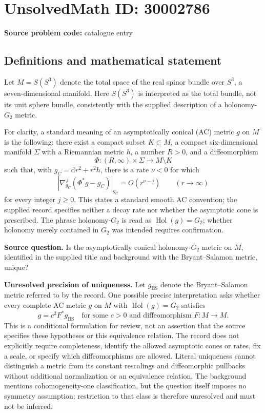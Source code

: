 \documentclass[11pt]{article}
\begin{document}
\section*{UnsolvedMath ID: 30002786}
\textbf{Source problem code:} catalogue entry
\subsection{Definitions and mathematical statement}
Let \(M=S(S^3)\) denote the total space of the real spinor bundle over \(S^3\), a seven-dimensional manifold. Here \(S(S^3)\) is interpreted as the total bundle, not its unit sphere bundle, consistently with the supplied description of a holonomy-\(G_2\) metric.

For clarity, a standard meaning of an asymptotically conical (AC) metric \(g\) on \(M\) is the following: there exist a compact subset \(K\subset M\), a compact six-dimensional manifold \(\Sigma\) with a Riemannian metric \(h\), a number \(R>0\), and a diffeomorphism
\[
\Phi:(R,\infty)\times\Sigma\longrightarrow M\setminus K
\]
such that, with \(g_C=\mathrm{d}r^2+r^2h\), there is a rate \(\nu<0\) for which
\[
\left|\nabla_{g_C}^{\,j}(\Phi^*g-g_C)\right|_{g_C}
=O(r^{\nu-j})\qquad(r\to\infty)
\]
for every integer \(j\geq0\). This states a standard smooth AC convention; the supplied record specifies neither a decay rate nor whether the asymptotic cone is prescribed. The phrase holonomy-\(G_2\) is read as \(\operatorname{Hol}(g)=G_2\); whether holonomy merely contained in \(G_2\) was intended requires confirmation.

\textbf{Source question.} Is the asymptotically conical holonomy-\(G_2\) metric on \(M\), identified in the supplied title and background with the Bryant--Salamon metric, unique?

\textbf{Unresolved precision of uniqueness.} Let \(g_{\mathrm{BS}}\) denote the Bryant--Salamon metric referred to by the record. One possible precise interpretation asks whether every complete AC metric \(g\) on \(M\) with \(\operatorname{Hol}(g)=G_2\) satisfies
\[
 g=c^2F^*g_{\mathrm{BS}}
 \quad\text{for some }c>0\text{ and diffeomorphism }F:M\longrightarrow M.
\]
This is a conditional formulation for review, not an assertion that the source specifies these hypotheses or this equivalence relation. The record does not explicitly require completeness, identify the allowed asymptotic cones or rates, fix a scale, or specify which diffeomorphisms are allowed. Literal uniqueness cannot distinguish a metric from its constant rescalings and diffeomorphic pullbacks without additional normalization or an equivalence relation. The background mentions cohomogeneity-one classification, but the question itself imposes no symmetry assumption; restriction to that class is therefore unresolved and must not be inferred.
\end{document}
